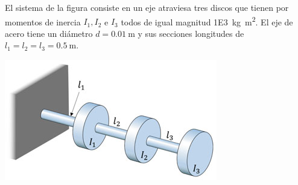 \documentclass[11pt, spanish, a4paper, twopage]{article}
\begin{document}
\begin{enumerate}
\begin{minipage}[t][2.5cm]{0.65\textwidth}
El sistema de la figura consiste en un eje atraviesa tres discos que tienen por momentos de inercia \(I_1, I_2\) e \(I_3\) todos de igual magnitud \SI{1E3}{\kilo\gram\metre\squared}.
El eje de acero tiene un diámetro \(d = \SI{0.01}{\metre}\) y sus secciones longitudes de \(l_1 = l_2 = l_3 = \SI{0.5}{\metre}\).
\end{minipage}
\begin{minipage}[c][1cm][t]{0.3\textwidth}
	\includegraphics[width=\textwidth]{figures/shabana_fig_P3_5.png}
\end{minipage}



\end{enumerate}
\end{document}
